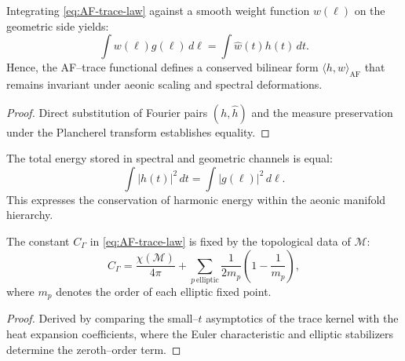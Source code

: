 
\begin{theorem}
\label{thm:AF-conservation}
Integrating \eqref{eq:AF-trace-law}
against a smooth weight function \(w(\ell)\)
on the geometric side yields:
\begin{equation}
\label{eq:integrated-trace}
\int w(\ell) g(\ell)\,d\ell
=
\int \widehat{w}(t)h(t)\,dt.
\end{equation}
Hence, the AF–trace functional defines a conserved bilinear form
\(\langle h, w \rangle_{\mathrm{AF}}\)
that remains invariant under aeonic scaling and spectral deformations.
\end{theorem}

\begin{proof}
Direct substitution of Fourier pairs
\((h,\widehat{h})\)
and the measure preservation
under the Plancherel transform
establishes equality.
\end{proof}

\begin{corollary}
The total energy stored in spectral and geometric channels
is equal:
\[
\int |h(t)|^2\,dt = \int |g(\ell)|^2\,d\ell.
\]
This expresses the conservation of harmonic energy
within the aeonic manifold hierarchy.
\end{corollary}


\begin{lemma}
\label{lem:topo-correction}
The constant \(C_\Gamma\) in \eqref{eq:AF-trace-law}
is fixed by the topological data of \(\mathcal{M}\):
\[
C_\Gamma
=
\frac{\chi(\mathcal{M})}{4\pi}
+
\sum_{p\,\text{elliptic}}
\frac{1}{2m_p}\left(1 - \frac{1}{m_p}\right),
\]
where \(m_p\)
denotes the order of each elliptic fixed point.
\]
\end{lemma}

\begin{proof}
Derived by comparing the small–\(t\)
asymptotics of the trace kernel with the heat expansion coefficients,
where the Euler characteristic and elliptic stabilizers
determine the zeroth–order term.
\end{proof}

